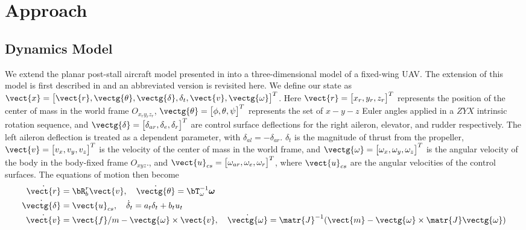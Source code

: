\section{Approach}

\subsection{Dynamics Model}

We extend the planar post-stall aircraft model presented in \cite{moore2014robust} into a three-dimensional model of a fixed-wing UAV. The extension of this model is first described in \cite{basescu2020icra} and an abbreviated version is revisited here.
We define our state as $\vect{x} = \begin{bmatrix} \vect{r}, \vectg{\theta}, \vectg{\delta}, \delta_t, \vect{v}, \vectg{\omega}\end{bmatrix}^T$. Here $\vect{r} =\begin{bmatrix} x_r,y_r,z_r\end{bmatrix}^T$ represents the position of the center of mass in the world frame $O_{x_r y_r z_r}$, $\vectg{\theta}= \begin{bmatrix} \phi, \theta, \psi\end{bmatrix}^T$ represents the set of $x-y-z$ Euler angles applied in a $ZYX$ intrinsic rotation sequence, and $\vectg{\delta} = \begin{bmatrix} \delta_{ar}, \delta_e, \delta_r \end{bmatrix}^T$ are control surface deflections for the right aileron, elevator, and rudder respectively. The left aileron deflection is treated as a dependent parameter, with $\delta_{al} = -\delta_{ar}$. $\delta_t$ is the magnitude of thrust from the propeller, $\vect{v} = \begin{bmatrix} v_x, v_y, v_z\end{bmatrix}^T$ is the velocity of the center of mass in the world frame, and $\vectg{\omega} = \begin{bmatrix}\omega_x, \omega_y, \omega_z\end{bmatrix}^T$ is the angular velocity of the body in the body-fixed frame $O_{xyz}$., and  $\vect{u}_{cs} = \begin{bmatrix} \omega_{ar}, \omega_{e}, \omega_{r}\end{bmatrix}^T$, where $\vect{u}_{cs}$ are the angular velocities of the control surfaces.
The equations of motion then become
\begin{align}
\dot{\vect{r}} &= \bR_b^r \vect{v},\quad \dot{\vectg{\theta}} = {\bT}_{\omega}^{-1}{\boldsymbol \omega}\nonumber\\
\dot{\vectg{\delta}} &= \vect{u}_{cs}, \quad \dot{\delta}_t = a_t \delta_t + b_t u_t\nonumber\\
\dot{\vect{v}} &= \vect{f}/m - \vectg{\omega}\times \vect{v},\quad \dot{\vectg{\omega}} = \matr{J}^{-1}(\vect{m}-\vectg{\omega}\times\matr{J}\vectg{\omega})
\label{eq:eom}
\end{align}

